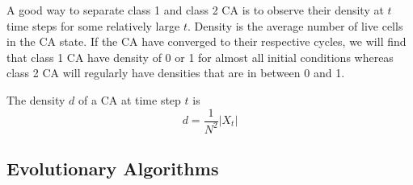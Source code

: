 A good way to separate class 1 and class 2 CA is to observe their density at $t$ time steps for some relatively large $t$. Density is the average number of live cells in the CA state. If the CA have converged to their respective cycles, we will find that class 1 CA have density of 0 or 1 for almost all initial conditions whereas class 2 CA will regularly have densities that are in between 0 and 1.\\

\begin{definition}[Density]
The density $d$ of a CA at time step $t$ is
\begin{equation}
    d = \frac{1}{N^2} \left| X_{t} \right|
\end{equation}
\end{definition}


    


\subsection{Evolutionary Algorithms}

